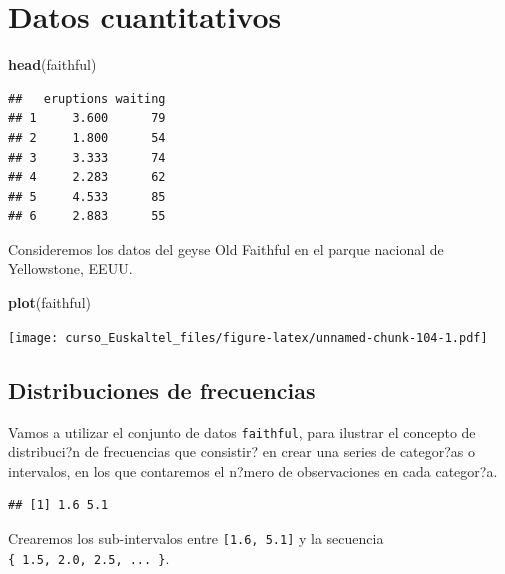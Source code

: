 \documentclass[]{book}
\newenvironment{Shaded}{\begin{snugshade}}{\end{snugshade}}
\newcommand{\KeywordTok}[1]{\textcolor[rgb]{0.13,0.29,0.53}{\textbf{#1}}}
\newcommand{\StringTok}[1]{\textcolor[rgb]{0.31,0.60,0.02}{#1}}
\newcommand{\OperatorTok}[1]{\textcolor[rgb]{0.81,0.36,0.00}{\textbf{#1}}}
\newcommand{\NormalTok}[1]{#1}
\begin{document}
\section{Datos cuantitativos}\label{datos-cuantitativos}

\begin{Shaded}
\begin{Highlighting}[]
\KeywordTok{head}\NormalTok{(faithful)}
\end{Highlighting}
\end{Shaded}

\begin{verbatim}
##   eruptions waiting
## 1     3.600      79
## 2     1.800      54
## 3     3.333      74
## 4     2.283      62
## 5     4.533      85
## 6     2.883      55
\end{verbatim}

Consideremos los datos del geyse Old Faithful en el parque nacional de
Yellowstone, EEUU.

\begin{Shaded}
\begin{Highlighting}[]
\KeywordTok{plot}\NormalTok{(faithful)}
\end{Highlighting}
\end{Shaded}

\texttt{[image: curso\_Euskaltel\_files/figure-latex/unnamed-chunk-104-1.pdf]}

\subsection{Distribuciones de
frecuencias}\label{distribuciones-de-frecuencias}

Vamos a utilizar el conjunto de datos \texttt{faithful}, para ilustrar
el concepto de distribuci?n de frecuencias que consistir? en crear una
series de categor?as o intervalos, en los que contaremos el n?mero de
observaciones en cada categor?a.

\begin{Shaded}
\end{Shaded}

\begin{verbatim}
## [1] 1.6 5.1
\end{verbatim}

Crearemos los sub-intervalos entre \texttt{{[}1.6,\ 5.1{]}} y la
secuencia \texttt{\{\ 1.5,\ 2.0,\ 2.5,\ ...\ \}}.
\end{document}
